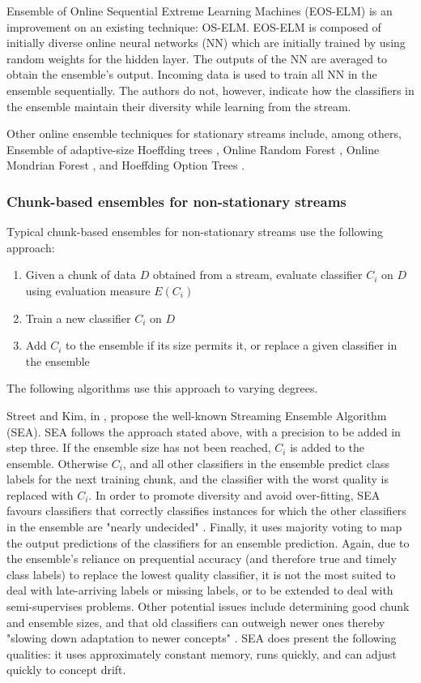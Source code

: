 Ensemble of Online Sequential Extreme Learning Machines (EOS-ELM) \cite{lan2009ensemble, KRAWCZYK2017132} is an improvement on an existing technique: OS-ELM. EOS-ELM is composed of initially diverse online neural networks (NN) which are initially trained by using random weights for the hidden layer. The outputs of the NN are averaged to obtain the ensemble's output. Incoming data is used to train all NN in the ensemble sequentially. The authors do not, however, indicate how the classifiers in the ensemble maintain their diversity while learning from the stream.

Other online ensemble techniques for stationary streams include, among others, Ensemble of adaptive-size Hoeffding trees \cite{bifet2009improving}, Online Random Forest \cite{denil2013consistency, saffari2009line}, Online Mondrian Forest \cite{lakshminarayanan2014mondrian}, and Hoeffding Option Trees \cite{gama2010knowledge}.

\subsubsection{Chunk-based ensembles for non-stationary streams}
Typical chunk-based ensembles for non-stationary streams use the following approach:
\begin{enumerate}
\item Given a chunk of data $D$ obtained from a stream, evaluate classifier $C_i$ on $D$ using evaluation measure $E(C_i)$
\item Train a new classifier $C_i$ on $D$
\item Add $C_i$ to the ensemble if its size permits it, or replace a given classifier in the ensemble
\end{enumerate}

The following algorithms use this approach to varying degrees.

Street and Kim, in \cite{street2001streaming}, propose the well-known Streaming Ensemble Algorithm (SEA). SEA follows the approach stated above, with a precision to be added in step three. If the ensemble size has not been reached, $C_i$ is added to the ensemble. Otherwise $C_i$, and all other classifiers in the ensemble predict class labels for the next training chunk, and the classifier with the worst quality is replaced with $C_i$. In order to promote diversity and avoid over-fitting, SEA favours classifiers that correctly classifies instances for which the other classifiers in the ensemble are "nearly undecided" \cite{street2001streaming}. Finally, it uses majority voting to map the output predictions of the classifiers for an ensemble prediction. Again, due to the ensemble's reliance on prequential accuracy (and therefore true and timely class labels) to replace the lowest quality classifier, it is not the most suited to deal with late-arriving labels or missing labels, or to be extended to deal with semi-supervises problems. Other potential issues include determining good chunk and ensemble sizes, and that old classifiers can outweigh newer ones thereby "slowing down adaptation to newer concepts" \cite{KRAWCZYK2017132}. SEA does present the following qualities: it uses approximately constant memory, runs quickly, and can adjust quickly to concept drift.

